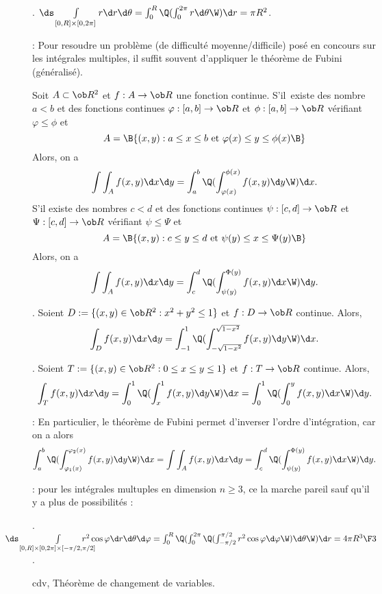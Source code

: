 \Exemple. $\ds\int\limits_{[0,R]\times[0,2\pi]}r\d r\d\theta=\int_0^R\Q(\int_0^{2\pi}r\d\theta\W)\d r=\pi R^2$. 
\bigskip


 : Pour resoudre un problème (de difficulté moyenne/difficile) posé en concours sur les intégrales multiples, il suffit souvent d'appliquer le théorème de Fubini (généralisé). 
\bigskip


\Theoreme [Index=Theoreme@Théorème!de Fubini;Title=Théorème de Fubini {\it généralisé}]
Soit $A\subset \ob R^2$ et $f:A\to\ob R$ une fonction continue. S'il~existe 
des nombre $a< b$ et des fonctions continues $\varphi:[a,b]\to\ob R$ et $\phi:[a,b]\to\ob R$ vérifiant $\varphi\le \phi$ et 
$$
A=\B\{(x,y):a\le x\le b\mbox{ et }\varphi(x)\le y\le \phi(x)\B\}
$$
Alors, on a 
$$
\int\int_Af(x,y)\d x\d y=\int_a^b\Q(\int_{\varphi(x)}^{\phi(x)}f(x,y)\d y\W)\d x.
$$
S'il existe 
des nombres $c<d$ et des fonctions continues $\psi:[c,d]\to\ob R$ et $\Psi:[c,d]\to\ob R$ vérifiant $\psi\le\Psi$ et 
$$
A=\B\{(x,y):c\le y\le d\mbox{ et }\psi(y)\le x\le \Psi(y)\B\}
$$
Alors, on a 
$$
\int\int_Af(x,y)\d x\d y=\int_c^d\Q(\int_{\psi(y)}^{\Phi(y)}f(x,y)\d x\W)\d y.
$$
\bigskip

\Exemple.  Soient $D:=\{(x,y)\in\ob R^2:x^2+y^2\le 1\}$ et $f:D\to\ob R$ continue. 
Alors, $$
\int_Df(x,y)\d x\d y=\int_{-1}^1\Q(\int_{-\sqrt{1-x^2}}^{\sqrt{1-x^2}}f(x,y)\d y\W)\d x.
$$ 
\medskip

\Exemple.  Soient $T:=\{(x,y)\in\ob R^2:0\le x\le y\le 1\}$ et $f:T\to\ob R$ continue. Alors, 
$$
\int_Tf(x,y)\d x\d y=\int_0^1\Q(\int_x^1f(x,y)\d y\W)\d x=\int_0^1\Q(\int_0^yf(x,y)\d x\W)\d y.
$$ 
\bigskip


 : En particulier, le théorème de Fubini permet d'inverser l'ordre d'intégration, car on a alors 
$$
\int_a^b\Q(\int_{\varphi_1(x)}^{\varphi_2(x)}f(x,y)\d y\W)\d x=\int\int_Af(x,y)\d x\d y=\int_c^d\Q(\int_{\psi(y)}^{\Phi(y)}f(x,y)\d x\W)\d y.
$$


 : pour les intégrales multuples en dimension $n\ge3$, ce la marche pareil sauf qu'il y a plus de possibilités : 
\bigskip

\Exemple.  $\!\!\!\!\!\!\!\!\!\!\!\!\!\!\!\!\!\!\!\ds\int\limits_{[0,R]\times[0,2\pi]\times[-\pi/2,\pi/2]}\!\!\!\!\!\!\!\!\!\!\!r^2\cos\varphi\d r\d\theta\d\varphi=
\int_0^R\Q(\int_0^{2\pi}\Q(\int_{-\pi/2}^{\pi/2}r^2\cos\varphi\d\varphi\W)\d\theta\W)\d r={4\pi R^3\F3}$. 
\bigskip


\Subsection cdv, Théorème de changement de variables. 

